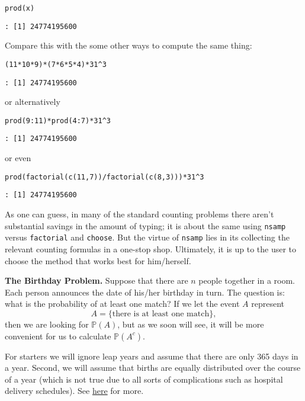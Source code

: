 \begin{Verbatim}
prod(x) 
\end{Verbatim}

\begin{verbatim}
: [1] 24774195600
\end{verbatim}

Compare this with the some other ways to compute the same thing: 

\begin{Verbatim}
(11*10*9)*(7*6*5*4)*31^3 
\end{Verbatim}

\begin{verbatim}
: [1] 24774195600
\end{verbatim}

or alternatively 

\begin{Verbatim}
prod(9:11)*prod(4:7)*31^3 
\end{Verbatim}

\begin{verbatim}
: [1] 24774195600
\end{verbatim}

or even 

\begin{Verbatim}
prod(factorial(c(11,7))/factorial(c(8,3)))*31^3 
\end{Verbatim}

\begin{verbatim}
: [1] 24774195600
\end{verbatim}



As one can guess, in many of the standard counting problems there
aren't substantial savings in the amount of typing; it is about the
same using \texttt{nsamp} versus \texttt{factorial} and \texttt{choose}. But the virtue of
\texttt{nsamp} lies in its collecting the relevant counting formulas in a
one-stop shop. Ultimately, it is up to the user to choose the method
that works best for him/herself.


\textbf{The Birthday Problem.} Suppose that there are \(n\) people together
in a room. Each person announces the date of his/her birthday in
turn. The question is: what is the probability of at least one match?
If we let the event \(A\) represent \[ A = \{ \mbox{there is at least
one match}\}, \] then we are looking for \(\mathbb{P}(A)\), but as we
soon will see, it will be more convenient for us to calculate
\(\mathbb{P}(A^{c})\).

For starters we will ignore leap years and assume that there are only
365 days in a year. Second, we will assume that births are equally
distributed over the course of a year (which is not true due to all
sorts of complications such as hospital delivery schedules). See \href{http://en.wikipedia.org/wiki/Birthday_problem}{here}
for more.

